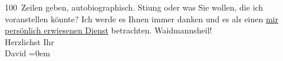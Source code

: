 \begin{ledgroupsized}[t]{13cm}
               100 Zeilen geben, autobiographisch. Sti{\geminationm}ung oder was Sie
               wollen, die ich voranstellen könnte? Ich werde {\pb}es Ihnen immer danken und es als einen \uline{mir persönlich erwiesenen Dienst} betrachten.\pend
           \pstart
           Waidmannsheil!{\\[\baselineskip]}Herzlichst Ihr{\\[\baselineskip]}\spacefill\mbox{David}\pend
           \leftskip=0em{}
         
         \endnumbering{}\end{ledgroupsized}  \newcommand{\dateiname}{L00500}\newcommand{\titel}{Jakob Julius David an Arthur Schnitzler, [5. 10. 1895]}\newcommand{\editorInnen}{Martin Anton Müller und Gerd-Hermann Susen}
      